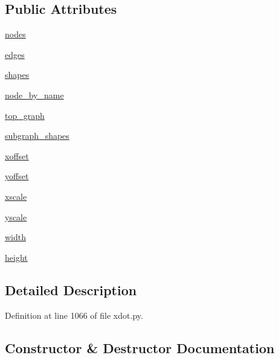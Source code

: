 \subsection*{Public Attributes}
\begin{DoxyCompactItemize}
\item 
\hyperlink{classsmacc__viewer_1_1xdot_1_1xdot_1_1XDotParser_abe817aefceb772f9c874fc46049d6cf4}{nodes}
\item 
\hyperlink{classsmacc__viewer_1_1xdot_1_1xdot_1_1XDotParser_a7c816c08835a7559802b2df9d60a19bc}{edges}
\item 
\hyperlink{classsmacc__viewer_1_1xdot_1_1xdot_1_1XDotParser_a768f7f940ba60d62b1913c212987f5ef}{shapes}
\item 
\hyperlink{classsmacc__viewer_1_1xdot_1_1xdot_1_1XDotParser_ab2ae36f76adbaf2c08f05eb5a3fb5557}{node\+\_\+by\+\_\+name}
\item 
\hyperlink{classsmacc__viewer_1_1xdot_1_1xdot_1_1XDotParser_a5c873e467edfbfa937d8a59a8e1853c2}{top\+\_\+graph}
\item 
\hyperlink{classsmacc__viewer_1_1xdot_1_1xdot_1_1XDotParser_aa2c8b09ed8274e0eeb753b28deb1c770}{subgraph\+\_\+shapes}
\item 
\hyperlink{classsmacc__viewer_1_1xdot_1_1xdot_1_1XDotParser_a62eaf1edc60a3fc0fa9de0ea6e4e48ae}{xoffset}
\item 
\hyperlink{classsmacc__viewer_1_1xdot_1_1xdot_1_1XDotParser_ac9489fc14a7ba7229f965c327b479385}{yoffset}
\item 
\hyperlink{classsmacc__viewer_1_1xdot_1_1xdot_1_1XDotParser_a3c3b5417bb8d937745bc0160d568915f}{xscale}
\item 
\hyperlink{classsmacc__viewer_1_1xdot_1_1xdot_1_1XDotParser_a89fee1a8bb775af0509be2bce06b6e34}{yscale}
\item 
\hyperlink{classsmacc__viewer_1_1xdot_1_1xdot_1_1XDotParser_a2fd09ff25776c1dcbb3b23fe1679a312}{width}
\item 
\hyperlink{classsmacc__viewer_1_1xdot_1_1xdot_1_1XDotParser_adc64dc74de1a8ccd5e77455467999e90}{height}
\end{DoxyCompactItemize}


\subsection{Detailed Description}


Definition at line 1066 of file xdot.\+py.



\subsection{Constructor \& Destructor Documentation}
